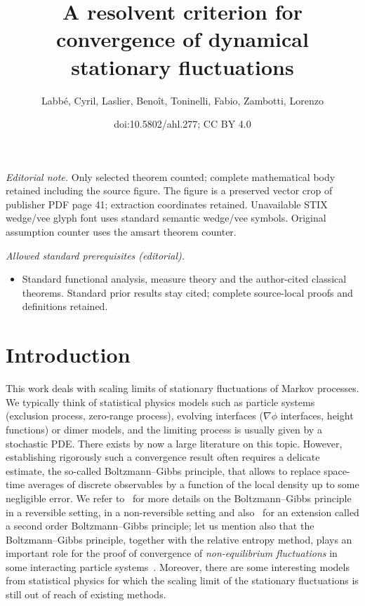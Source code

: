 \documentclass[10pt]{amsart}
\title{A resolvent criterion for convergence of dynamical stationary fluctuations}
\author{Labbé, Cyril, Laslier, Benoît, Toninelli, Fabio, Zambotti, Lorenzo}
\date{doi:10.5802/ahl.277; CC BY 4.0}
\theoremstyle{definition}\newtheorem{defi}[theo]{Definition}\newtheorem{rema}[theo]{Remark}\newtheorem{exam}[theo]{Example}\newtheorem{exem}[theo]{Example}\newtheorem{nota}[theo]{Notation}
\theoremstyle{plain}
\begin{document}
\maketitle
\noindent\textit{Editorial note.} Only selected theorem counted; complete mathematical body retained including the source figure. The figure is a preserved vector crop of publisher PDF page 41; extraction coordinates retained. Unavailable STIX wedge/vee glyph font uses standard semantic wedge/vee symbols. Original assumption counter uses the amsart theorem counter.\par\medskip
\noindent\textit{Allowed standard prerequisites (editorial).}\begin{itemize}
\item Standard functional analysis, measure theory and the author-cited classical theorems. Standard prior results stay cited; complete source-local proofs and definitions retained.
\end{itemize}\medskip



\setcounter{tocdepth}{1}
\tableofcontents

\section{Introduction}

This work deals with scaling limits of stationary fluctuations of Markov processes. We typically think of statistical physics models such as particle systems (exclusion process, zero-range process), evolving interfaces ($\nabla \phi$ interfaces, height functions) or dimer models, and the limiting process is usually given by a stochastic PDE. There exists by now a large literature on this topic. However, establishing rigorously such a convergence result often requires a delicate estimate, the so-called Boltzmann--Gibbs principle, that allows to replace space-time averages of discrete observables by a function of the local density up to some negligible error. We refer to~\cite[Section~11.1]{KipLan} for more details on the Boltzmann--Gibbs principle in a reversible setting, \cite{ChangLandimOlla} in a non-reversible setting and also~\cite{GoncalvesJara} for an extension called a second order Boltzmann--Gibbs principle; let us mention also that the Boltzmann--Gibbs principle, together with the relative entropy method, plays an important role for the proof of convergence of \emph{non-equilibrium fluctuations} in some interacting particle systems~\cite{JM}. Moreover, there are some interesting models from statistical physics for which the scaling limit of the stationary fluctuations is still out of reach of existing methods.
\end{document}
